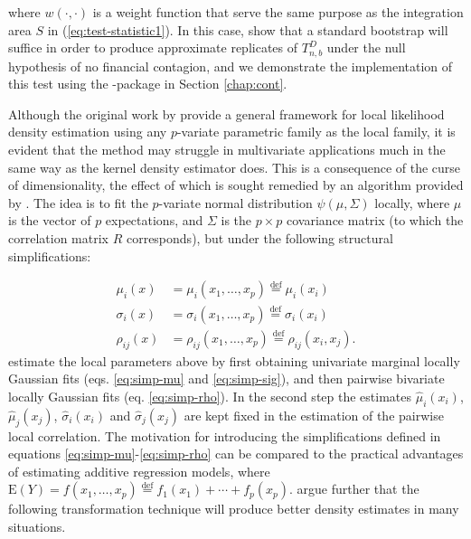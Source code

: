 where $w\left(\cdot, \cdot\right)$ is a weight function that serve the same purpose as the integration area $S$ in (\ref{eq:test-statistic1}). In this case, \cite{stov:tjos:huft:2014} show that a standard bootstrap will suffice in order to produce approximate replicates of $T_{n,b}^D$ under the null hypothesis of no financial contagion, and we demonstrate the implementation of this test using the -package in Section \ref{chap:cont}.

Although the original work by \cite{hjor:jone:1996} provide a general framework for local likelihood density estimation using any $p$-variate parametric family as the local family, it is evident that the method may struggle in multivariate applications much in the same way as the kernel density estimator does. This is a consequence of the curse of dimensionality, the effect of which is sought remedied by an algorithm provided by \cite{otne:tjos:2017}. The idea is to fit the $p$-variate normal distribution $\psi\left(\mu, \Sigma\right)$ locally, where $\mu$ is the vector of $p$ expectations, and $\Sigma$ is the $p\times p$ covariance matrix (to which the correlation matrix $R$ corresponds), but under the following structural simplifications:

\begin{align}
\mu_i\left(x\right) &= \mu_i\left(x_1, \ldots, x_p\right) \stackrel{\textrm{def}}{=} \mu_i\left(x_i\right) \label{eq:simp-mu}\\
\sigma_i\left(x\right) &= \sigma_i\left(x_1, \ldots, x_p\right)  \stackrel{\textrm{def}}{=} \sigma_i\left(x_i\right) \label{eq:simp-sig} \\
\rho_{ij}\left(x\right) &= \rho_{ij}\left(x_1, \ldots, x_p\right) \stackrel{\textrm{def}}{=} \rho_{ij}\left(x_i, x_j\right). \label{eq:simp-rho}
\end{align}
\cite{otne:tjos:2017} estimate the local parameters above by first obtaining univariate marginal locally Gaussian fits (eqs. \ref{eq:simp-mu} and \ref{eq:simp-sig}), and then pairwise bivariate locally Gaussian fits (eq. \ref{eq:simp-rho}). In the second step the estimates $\widehat\mu_i\left(x_i\right)$, $\widehat\mu_j\left(x_j\right)$, $\widehat\sigma_i\left(x_i\right)$ and $\widehat\sigma_j\left(x_j\right)$ are kept fixed in the estimation of the pairwise local correlation. The motivation for introducing the simplifications defined in equations \ref{eq:simp-mu}-\ref{eq:simp-rho} can be compared to the practical advantages of estimating additive regression models, where $\textrm{E}\left(Y\right) = f\left(x_1, \ldots, x_p\right) \stackrel{\textrm{def}}{=} f_1\left(x_1\right) + \cdots + f_p\left(x_p\right)$. \cite{otne:tjos:2017} argue further that the following transformation technique will produce better density estimates in many situations.


